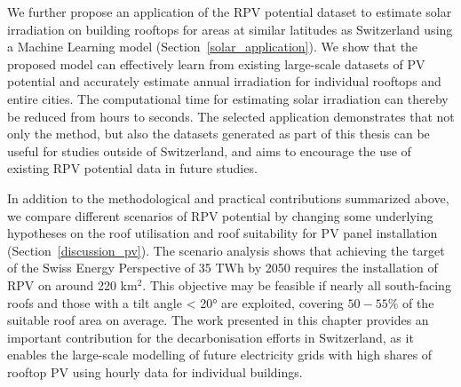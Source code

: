 We further propose an application of the RPV potential dataset to estimate solar irradiation on building rooftops for areas at similar latitudes as Switzerland using a Machine Learning model (Section~\ref{solar_application}).
We show that the proposed model can effectively learn from existing large-scale datasets of PV potential and accurately estimate annual irradiation for individual rooftops and entire cities. The computational time for estimating solar irradiation can thereby be reduced from hours to seconds.
The selected application demonstrates that not only the method, but also the datasets generated as part of this thesis can be useful for studies outside of Switzerland, and aims to encourage the use of existing RPV potential data in future studies.

In addition to the methodological and practical contributions summarized above, we compare different scenarios of RPV potential by changing some underlying hypotheses on the roof utilisation and roof suitability for PV panel installation (Section~\ref{discussion_pv}).
The scenario analysis shows that achieving the target of the Swiss Energy Perspective of 35 TWh by 2050 requires the installation of RPV on around 220 km$^2$.
This objective may be feasible if nearly all south-facing roofs and those with a tilt angle < 20° are exploited, covering $50 - 55$\% of the suitable roof area on average.
%
The work presented in this chapter provides an important contribution for the decarbonisation efforts in Switzerland, as it enables the large-scale modelling of future electricity grids with high shares of rooftop PV using hourly data for individual buildings. 

